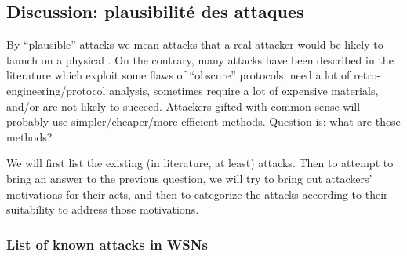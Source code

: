\subsection{Discussion: plausibilité des attaques}

By ``plausible'' attacks we mean \dos attacks that a real attacker would be likely to launch on a physical \wsn.
On the contrary, many attacks have been described in the literature which exploit some flaws of ``obscure'' protocols, need a lot of retro-engineering/protocol analysis, sometimes require a lot of expensive materials, and/or are not likely to succeed.
Attackers gifted with common-sense will probably use simpler/cheaper/more efficient methods.
Question is: what are those methods?

We will first list the existing (in literature, at least) \dos attacks.
Then to attempt to bring an answer to the previous question, we will try to bring out attackers' motivations for their acts, and then to categorize the attacks according to their suitability to address those motivations.

\subsubsection{List of known \dos attacks in WSNs}

